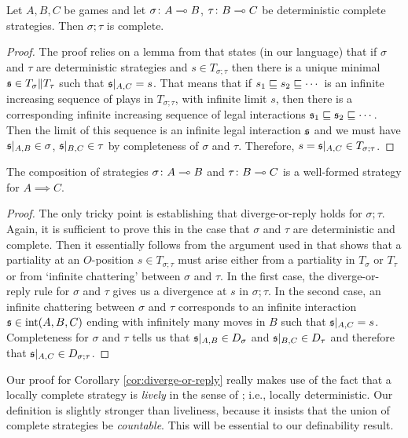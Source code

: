 \documentclass[sigplan,9pt,review]{acmart}\settopmatter{printfolios=true,printccs=false,printacmref=false}
\begin{document}
\begin{lemma}
  Let $A,B,C$ be games and let $\sigma\colon A\multimap B$, $\tau\colon B\multimap C$ be deterministic complete strategies.  
  Then $\sigma;\tau$ is complete.
  \label{lem:complete-deterministic-composition}
\end{lemma}
\begin{proof}
  The proof relies on a lemma from \cite{hoPcf} that states (in our language) that if $\sigma$ and $\tau$ are deterministic strategies and $s\in T_{\sigma;\tau}$ then there is a unique minimal $\mathfrak s\in T_\sigma\|T_\tau$ such that $\mathfrak s\vert_{A,C}=s$.  
  That means that if $s_1\sqsubseteq s_2\sqsubseteq \cdots$ is an infinite increasing sequence of plays in $T_{\sigma;\tau}$, with infinite limit $s$, then there is a corresponding infinite increasing sequence of legal interactions $\mathfrak s_1 \sqsubseteq \mathfrak s_2 \sqsubseteq \cdots$.  
  Then the limit of this sequence is an infinite legal interaction $\mathfrak s$ and we must have $\mathfrak s\vert_{A,B}\in\sigma$, $\mathfrak s\vert_{B,C}\in\tau$ by completeness of $\sigma$ and $\tau$.  
  Therefore, $s=\mathfrak s\vert_{A,C}\in T_{\sigma;\tau}$.
\end{proof}

\begin{corollary}
  The composition of strategies $\sigma\colon A\multimap B$ and $\tau\colon B \multimap C$ is a well-formed strategy for $A\implies C$.
  \label{cor:diverge-or-reply}
\end{corollary}
\begin{proof}
  The only tricky point is establishing that diverge-or-reply holds for $\sigma;\tau$.  
  Again, it is sufficient to prove this in the case that $\sigma$ and $\tau$ are deterministic and complete.
  Then it essentially follows from the argument used in \cite{abramskyjagadeesangames} that shows that a partiality at an $O$-position $s\in T_{\sigma;\tau}$ must arise either from a partiality in $T_\sigma$ or $T_\tau$ or from `infinite chattering' between $\sigma$ and $\tau$.  
  In the first case, the diverge-or-reply rule for $\sigma$ and $\tau$ gives us a divergence at $s$ in $\sigma;\tau$.  
  In the second case, an infinite chattering between $\sigma$ and $\tau$ corresponds to an infinite interaction $\mathfrak s\in\operatorname{int}(A,B,C)$ ending with infinitely many moves in $B$ such that $\mathfrak s\vert_{A,C}=s$. 
  Completeness for $\sigma$ and $\tau$ tells us that $\mathfrak s\vert_{A,B}\in D_\sigma$ and $\mathfrak s\vert_{B,C}\in D_\tau$ and therefore that $\mathfrak s\vert_{A,C}\in D_{\sigma;\tau}$.  
\end{proof}

Our proof for Corollary \ref{cor:diverge-or-reply} really makes use of the fact that a locally complete strategy is \emph{lively} in the sense of \cite{LevyGsInfinite}; i.e., locally deterministic.  
Our definition is slightly stronger than liveliness, because it insists that the union of complete strategies be \emph{countable}.  
This will be essential to our definability result.
\end{document}
